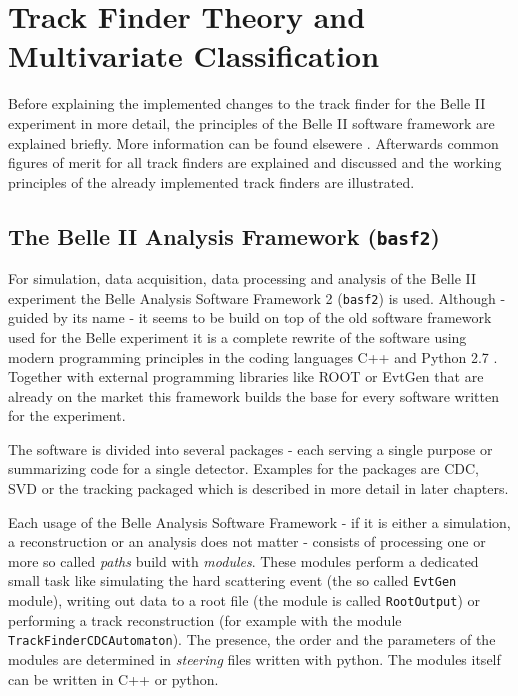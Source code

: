 \chapter{Track Finder Theory and Multivariate Classification}

Before explaining the implemented changes to the track finder for the Belle II experiment in more detail, the principles of the Belle II software framework are explained briefly. More information can be found elsewere \cite{tdr}. Afterwards common figures of merit for all track finders are explained and discussed and the working principles of the already implemented track finders are illustrated. 

\section{The Belle II Analysis Framework (\texttt{basf2})}

For simulation, data acquisition, data processing and analysis of the Belle II experiment the Belle Analysis Software Framework 2 (\texttt{basf2}) is used. Although - guided by its name - it seems to be build on top of the old software framework used for the Belle experiment it is a complete rewrite of the software using modern programming principles in the coding languages C++ \cite{cpp} and Python 2.7 \cite{python}. Together with external programming libraries like ROOT \cite{root} or EvtGen \cite{evtgen} that are already on the market this framework builds the base for every software written for the experiment.

The software is divided into several packages - each serving a single purpose or summarizing code for a single detector. Examples for the packages are CDC, SVD or the tracking packaged which is described in more detail in later chapters.

Each usage of the Belle Analysis Software Framework - if it is either a simulation, a reconstruction or an analysis does not matter - consists of processing one or more so called \emph{paths} build with \emph{modules}. These modules perform a dedicated small task like simulating the hard scattering event (the so called \texttt{EvtGen} module), writing out data to a root file (the module is called \texttt{RootOutput}) or performing a track reconstruction (for example with the module \texttt{TrackFinderCDCAutomaton}). The presence, the order and the parameters of the modules are determined in \emph{steering} files written with python. The modules itself can be written in C++ or python. 

